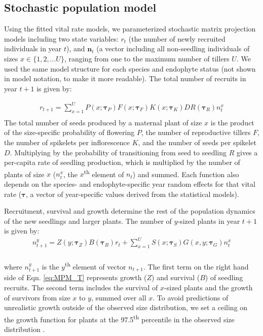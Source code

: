 \documentclass[9pt,twocolumn,twoside]{pnas-new}
\begin{document}
{\subsection*{Stochastic population model}
Using the fitted vital rate models, we parameterized stochastic matrix projection models including two state variables: $r_{t}$ (the number of newly recruited individuals in year $t$), and $\textbf{n}_{t}$ (a vector including all non-seedling individuals of sizes $x\in\{1,2,...U\} $, ranging from one to the maximum number of tillers $U$. 
We used the same model structure for each species and endophyte status (not shown in model notation, to make it more readable). 
The total number of recruits in year $t+1$ is given by:

\begin{equation} 
	\label{eq:MPM_F}
	\begin{aligned}
		r_{t+1} = \sum_{x=1}^{U} P(x; \pmb{\tau}_{P})F(x; \pmb{\tau}_{F})K(x; \pmb{\tau}_{K})DR(\pmb{\tau}_{R}) n^x_{t}\\
	\end{aligned}
\end{equation}
The total number of seeds produced by a maternal plant of size $x$ is the product of the size-specific probability of flowering $P$, the number of reproductive tillers $F$, the number of spikelets per inflorescence $K$, and the number of seeds per spikelet $D$. 
Multiplying by the probability of transitioning from seed to seedling $R$ gives a per-capita rate of seedling production, which is multiplied by the number of plants of size $x$ ($n^x_{t}$, the $x$\textsuperscript{th} element of \textbf{$n_{t}$}) and summed. 
Each function also depends on the species- and endophyte-specific year random effects for that vital rate ($\pmb{\tau}$, a vector of year-specific values derived from the statistical models). 

Recruitment, survival and growth determine the rest of the population dynamics of the new seedlings and larger plants. 
The number of $y$-sized plants in year $t+1$ is given by:
\begin{equation} 
	\label{eq:MPM_T}
	\begin{aligned}
		n^y_{t+1} = Z(y; \pmb{\tau}_{Z})B(\pmb{\tau}_{B})r_{t}  + 
		\sum_{x=1}^{U} S(x; \pmb{\tau}_{S})G(x,y; \pmb{\tau}_{G}) n^x_{t}\\
	\end{aligned}
\end{equation}

where $n^y_{t+1}$ is the $y$\textsuperscript{th} element of vector \textbf{$n_{t+1}$}.
The first term on the right hand side of Eqn. \ref{eq:MPM_T} represents growth ($Z$) and survival ($B$) of seedling recruits. 
The second term includes the survival of $x$-sized plants and the growth of survivors from size $x$ to $y$, summed over all $x$. 
To avoid predictions of unrealistic growth outside of the observed size distribution, we set a ceiling on the growth function for plants at the 97.5\textsuperscript{th} percentile in the observed size distribution \cite{williams2012avoiding}.

}
\end{document}
